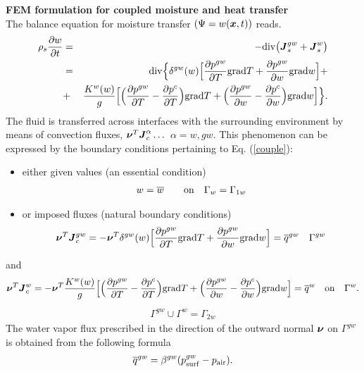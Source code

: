{\bf FEM formulation for coupled moisture and heat transfer}\\

The balance equation for moisture transfer $(\Psi = w(\mbox{\boldmath$x$},t))$ reads.
\begin{eqnarray}\label{couple}
\rho_s \frac{\partial w}{\partial t} &=& - {\rm div} \big(\mbox{\boldmath$J$}_s^{gw}+ \mbox{\boldmath$J$}_s^w\big) \nonumber\\
&=& {\rm div} \Big\{ \delta^{gw}(w) \Big[ \frac{\partial p^{gw}}{\partial T} {\rm grad} T 
+ \frac{\partial p^{gw}}{\partial w} {\rm grad} w \Big] + \nonumber\\ &+& \frac{K^w(w)}{g} \Big[\Big(
\frac{\partial p^{gw}}{\partial T} - \frac{\partial p^{c}}{\partial T}\Big) {\rm grad} T
+ \Big(\frac{\partial p^{gw}}{\partial w} - \frac{\partial p^{c}}{\partial w}\Big) {\rm grad} w \Big]\Big\}.
\end{eqnarray}
The fluid is transferred across interfaces with the surrounding environment by means of convection 
fluxes, $\mbox{\boldmath$\nu$}^T\mbox{\boldmath$J$}_c^{\alpha} \dots$ $\alpha = w, gw$. This phenomenon can be expressed 
by the boundary conditions pertaining to Eq. (\ref{couple}):
\begin{itemize}
\item{either given values (an essential condition)}
\begin{eqnarray}
w=\overline{w} \qquad {\rm on} \quad \Gamma_w = \Gamma_{1w}
\end{eqnarray}
\item{or imposed fluxes (natural boundary conditions)}
\begin{eqnarray}
\mbox{\boldmath$\nu$}^T \mbox{\boldmath$J$}_c^{gw} = - \mbox{\boldmath$\nu$}^T {\delta}^{gw}(w) \Big[ \frac{\partial 
p^{gw}}{\partial T} {\rm grad} T + \frac{\partial p^{gw}}{\partial w} {\rm grad} w \Big]
= \overline{q}^{gw} \quad \Gamma^{gw}
\end{eqnarray}
\end{itemize}
and
\begin{eqnarray}
\mbox{\boldmath$\nu$}^T \mbox{\boldmath$J$}_c^{w} = - \mbox{\boldmath$\nu$}^T \frac{K^w(w)}{g} \Big[\Big(
\frac{\partial p^{gw}}{\partial T} - \frac{\partial p^{c}}{\partial T}\Big) {\rm grad} T
+ \Big(\frac{\partial p^{gw}}{\partial w} - \frac{\partial p^{c}}{\partial w}\Big) {\rm grad} w \Big]
= \overline{q}^{w} \quad {\rm on} \quad \Gamma^{w}\nonumber.
\end{eqnarray}
\begin{eqnarray}
{\Gamma^{gw} \cup \Gamma^w = \Gamma_{2w}}\nonumber
\end{eqnarray}	
The water vapor flux prescribed in the direction of the outward normal $\mbox{\boldmath$\nu$}$ 
on $\Gamma^{gw}$ 
is obtained from the following formula \cite{ctu}
\begin{eqnarray}
\overline{q}^{gw} = \beta^{gw} (p_{\rm surf}^{gw} - p_{\rm air}).
\end{eqnarray}

